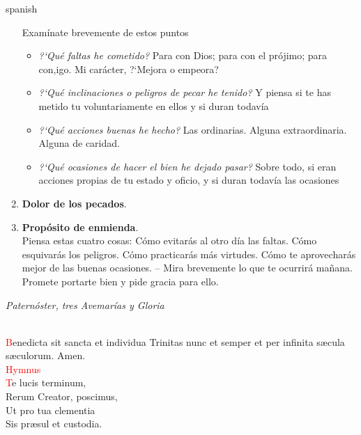 \documentclass[9pt]{article}
\begin{document}
\begin{multicols*}{2}
\begin{otherlanguage*}{spanish}
\begin{enumerate}[noitemsep]
                        Examínate brevemente de estos puntos
                        \begin{itemize}[noitemsep]
                              \item \textit{{?`}Qué faltas he cometido?} Para con Dios; para con el prójimo; para con,igo. Mi carácter, {?`}Mejora o empeora?
                              \item \textit{{?`}Qué inclinaciones o peligros de pecar he tenido?} Y piensa si te has metido tu voluntariamente en ellos y si duran todavía 
                              \item \textit{{?`}Qué acciones buenas he hecho?} Las ordinarias. Alguna extraordinaria. Alguna de caridad. 
                              \item \textit{{?`}Qué ocasiones de hacer el bien he dejado pasar?} Sobre todo, si eran acciones propias de tu estado y oficio, y si duran todavía las ocasiones
                        \end{itemize}
                  \item \textbf{Dolor de los pecados}.\\
                        
                  \item \textbf{Propósito de enmienda}.\\
                        Piensa estas cuatro cosas: Cómo evitarás al otro día las faltas. Cómo esquivarás los peligros. Cómo practicarás más virtudes. Cómo te aprovecharás mejor de las buenas ocasiones. -- Mira brevemente lo que te ocurrirá mañana. Promete portarte bien y pide gracia para ello.
            \end{enumerate}
            \vspace{1mm}
            \noindent\textit{Paternóster, tres Avemarías y Gloria}\\[-3mm]
      \end{otherlanguage*}
      \\[1mm]
      \textcolor{red}{B}enedicta sit sancta et individua Trinitas nunc et semper et per infinita s{\ae}cula s{\ae}culorum. Amen.\\[1mm]
      \textcolor{red}{Hymnus}\\
      \textcolor{red}{T}e lucis terminum,\\
      Rerum Creator, poscimus,\\
      Ut pro tua clementia\\
      Sis pr{\ae}sul et custodia.\\

\end{multicols*}
\end{document}
